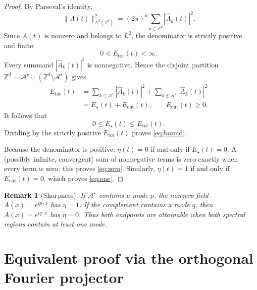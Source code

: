 \documentclass[11pt]{article}
\newtheorem{remark}{Remark}
\newcommand{\T}{\mathbb{T}}
\newcommand{\Z}{\mathbb{Z}}
\newcommand{\norm}[1]{\lVert #1\rVert}
\begin{document}
\begin{proof}
By Parseval's identity,
\begin{equation}\label{eq:parseval}
\norm{A(t)}_{L^2(\T^d)}^2
=(2\pi)^d\sum_{k\in\Z^d}|\widehat A_k(t)|^2.
\end{equation}
Since $A(t)$ is nonzero and belongs to $L^2$, the denominator is
strictly positive and finite:
\[
0<E_{\mathrm{tot}}(t)<\infty.
\]
Every summand $|\widehat A_k(t)|^2$ is nonnegative. Hence the disjoint
partition $\Z^d=\mathcal A^\star\sqcup(\Z^d\setminus\mathcal A^\star)$
gives
\begin{align*}
E_{\mathrm{tot}}(t)
&=\sum_{k\in\mathcal A^\star}|\widehat A_k(t)|^2
+\sum_{k\notin\mathcal A^\star}|\widehat A_k(t)|^2\\
&=E_\star(t)+E_{\mathrm{out}}(t),
\qquad E_{\mathrm{out}}(t)\geq0.
\end{align*}
It follows that
\[
0\leq E_\star(t)\leq E_{\mathrm{tot}}(t).
\]
Dividing by the strictly positive $E_{\mathrm{tot}}(t)$ proves
\eqref{eq:bound}.

Because the denominator is positive, $\eta(t)=0$ if and only if
$E_\star(t)=0$. A (possibly infinite, convergent) sum of nonnegative
terms is zero exactly when every term is zero; this proves
\eqref{eq:zero}. Similarly, $\eta(t)=1$ if and only if
$E_{\mathrm{out}}(t)=0$, which proves \eqref{eq:one}.
\end{proof}

\begin{remark}[Sharpness]
If $\mathcal A^\star$ contains a mode $p$, the nonzero field
$A(x)=e^{ip\cdot x}$ has $\eta=1$. If the complement contains a mode
$q$, then $A(x)=e^{iq\cdot x}$ has $\eta=0$. Thus both endpoints are
attainable when both spectral regions contain at least one mode.
\end{remark}

\section{Equivalent proof via the orthogonal Fourier projector}
\end{document}
